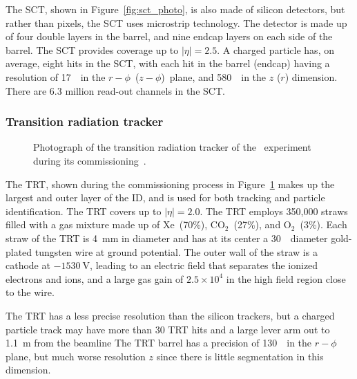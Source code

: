 The SCT, shown in Figure~\ref{fig:sct_photo}, is also made of silicon
detectors, but rather than pixels, the SCT uses microstrip technology.
The detector is made up of four double layers in the barrel, and nine
endcap layers on each side of the barrel.
The SCT provides coverage up to $|\eta| = 2.5$.
A charged particle has, on average, eight hits in the SCT, with each hit
in the barrel (endcap) having a resolution of 17~\um\ in the
$r-\phi$~($z-\phi$)~plane, and 580~\um\ in the $z$ ($r$) dimension.
There are 6.3 million read-out channels in the SCT.

\FloatBarrier
\subsubsection{Transition radiation tracker} 
\label{sec:trt}

\begin{figure}[ht]
  \caption{
    Photograph of the transition radiation tracker of the
    \atlas\ experiment during its commissioning~\cite{Maximilien:889555}.
  }
  \label{fig:trt_module}
\end{figure}

The TRT, shown during the commissioning process in Figure~\ref{fig:trt_module}
makes up the largest and outer layer of the ID, and is used for both tracking
and particle identification.
The TRT covers up to $|\eta| = 2.0$.
The TRT employs 350,000 straws filled with a gas mixture made up of
Xe~(70\%), $\text{CO}_2$~(27\%), and $\text{O}_2$~(3\%).
Each straw of the TRT is 4~mm in diameter and has at its center a
30~\um\ diameter gold-plated tungsten wire at ground potential.
The outer wall of the straw is a cathode at $-1530~\mathrm{V}$, leading to
an electric field that separates the ionized electrons and ions, and a large
gas gain of $2.5 \times 10^{4}$ in the high field region close to the wire.

The TRT has a less precise resolution than the silicon trackers, but a charged
particle track may have more than 30 TRT hits and a large lever arm out
to 1.1~m from the beamline
The TRT barrel has a precision of 130~\um\  in the $r-\phi$ plane, but much
worse resolution $z$ since there is little segmentation in this dimension.

